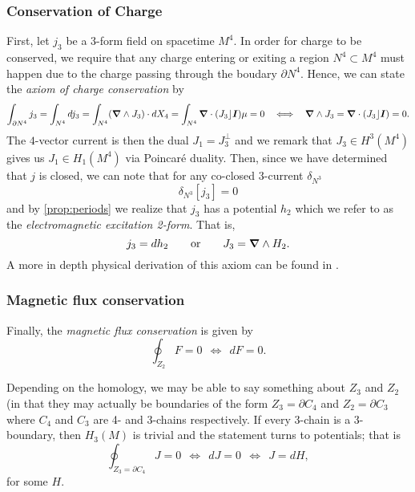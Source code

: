 \documentclass[conf]{new-aiaa}
\begin{document}
\subsubsection{Conservation of Charge}
First, let $j_3$ be a 3-form field on spacetime $M^4$. In order for charge to be conserved, we require that any charge entering or exiting a region $N^4 \subset M^4$ must happen due to the charge passing through the boudary $\partial N^4$. Hence, we can state the \emph{axiom of charge conservation} by
\begin{equation}
    \label{eq:topological_charge_conservation}
    \int_{\partial N^4} j_3 = \int_{N^4} dj_3= \int_{N^4} (\boldsymbol{\nabla} \wedge J_3) \cdot dX_4 = \int_{N^4} \boldsymbol{\nabla} \cdot (J_3 \rfloor \boldsymbol{I}) \mu = 0    ~~\iff~~ \boldsymbol{\nabla} \wedge J_3=\boldsymbol{\nabla} \cdot (J_3 \rfloor \boldsymbol{I}) = 0.
\end{equation}
The $4$-vector current is then the dual $J_1 = J_3^\perp$ and we remark that $J_3 \in H^3(M^4)$ gives us $J_1 \in H_1(M^4)$ via Poincar\'e duality. Then, since we have determined that $j$ is closed, we can note that for any co-closed $3$-current $\delta_{N^3}$
\begin{equation}
    \delta_{N^3}[j_3] = 0
\end{equation}
and by \cref{prop:periods} we realize that $j_3$ has a potential $h_2$ which we refer to as the \emph{electromagnetic excitation 2-form}. That is, 
\begin{equation}
    j_3=dh_2 \qquad \textrm{or} \qquad J_3 = \boldsymbol{\nabla} \wedge H_2.
\end{equation}
A more in depth physical derivation of this axiom can be found in \cite[B.1.1-B.1.15]{hehl_foundations_2003}.

\subsubsection{Magnetic flux conservation}
Finally, the \emph{magnetic flux conservation} is given by
\begin{equation}
    \label{eq:magnetic_flux_conservation}
    \oint_{Z_2} F = 0  ~~\iff~~ dF=0.
\end{equation}

Depending on the homology, we may be able to say something about $Z_3$ and $Z_2$ (in that they may actually be boundaries of the form $Z_3 = \partial C_4$ and $Z_2 = \partial C_3$ where $C_4$ and $C_3$ are 4- and 3-chains respectively. If every 3-chain is a 3-boundary, then $H_3(M)$ is trivial and the statement turns to potentials; that is
\begin{equation}
\label{eq:charge_potential}
\oint_{Z_3=\partial C_4} J = 0  ~~\iff~~ dJ=0 ~~ \iff ~~ J=dH,
\end{equation}
for some $H$. 
\end{document}
